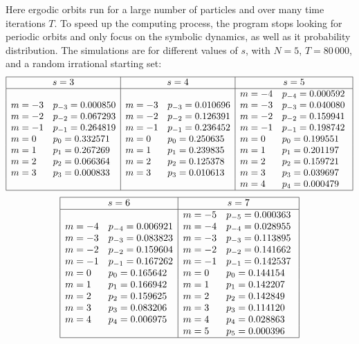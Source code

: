 Here ergodic orbits run for a large number of particles and over many
time iterations $T$. To speed up the computing process, the program stops
looking for periodic orbits and only focus on the symbolic dynamics, as
well as it probability distribution. The simulations are for different
values of $s$, with $N = 5$, $T = 80\,000$, and a random irrational
starting set:
\[
\begin{array}{| ll | ll | ll |}
\hline
\multicolumn{2}{|c|}{s = 3} & \multicolumn{2}{c|}{s = 4} & \multicolumn{2}{c|}{s=5} \\
\hline
\: & \: & \: & \: & m = -4 & p_{-4} = 0.000592 \\
m = -3 & p_{-3} = 0.000850 & m = -3 & p_{-3} = 0.010696 &  m = -3 & p_{-3} = 0.040080 \\
m = -2 & p_{-2} = 0.067293 & m = -2 & p_{-2} = 0.126391 &  m = -2 & p_{-2} = 0.159941\ \\
m = -1 & p_{-1} = 0.264819 & m = -1 & p_{-1} = 0.236452 & m = -1 & p_{-1} = 0.198742\\
m = 0 & p_{0} = 0.332571 & m = 0 & p_{0} = 0.250635 & m = 0 & p_{0} = 0.199551 \\
m = 1 & p_{1} = 0.267269 & m = 1 & p_{1} = 0.239835 & m = 1 & p_{1} = 0.201197\\
m = 2 & p_{2} = 0.066364 & m = 2 & p_{2} = 0.125378 & m = 2 & p_{2} = 0.159721\\
m = 3 & p_{3} = 0.000833 & m = 3 & p_{3} = 0.010613 & m = 3 & p_{3} = 0.039697\\
\: & \: & \: & \: & m = 4 & p_{4} = 0.000479 \\
\hline
\end{array}
\]
\[
\begin{array}{| ll | ll |}
\hline
\multicolumn{2}{|c|}{s = 6} & \multicolumn{2}{c|}{s = 7} \\
\hline
\: & \: & m = -5 & p_{-5} = 0.000363 \\
m = -4 & p_{-4} = 0.006921 & m = -4 & p_{-4} = 0.028955 \\
m = -3 & p_{-3} = 0.083823 & m = -3 & p_{-3} = 0.113895\ \\
m = -2 & p_{-2} = 0.159604 & m = -2 & p_{-2} = 0.141662\\
m = -1 & p_{-1} = 0.167262 & m = -1 & p_{-1} = 0.142537  \\
m = 0 & p_{0} = 0.165642 & m = 0 & p_{0} = 0.144154 \\
m = 1 & p_{1} = 0.166942 & m = 1 & p_{1} = 0.142207\\
m = 2 & p_{2} = 0.159625 & m = 2 & p_{2} = 0.142849\\
m = 3 & p_{3} = 0.083206 & m = 3 & p_{3} = 0.114120\\
m = 4 & p_{4} = 0.006975 & m = 4 & p_{4} = 0.028863\\
\: & \: & m = 5 & p_{5} = 0.000396 \\
\hline
\end{array}
\]

